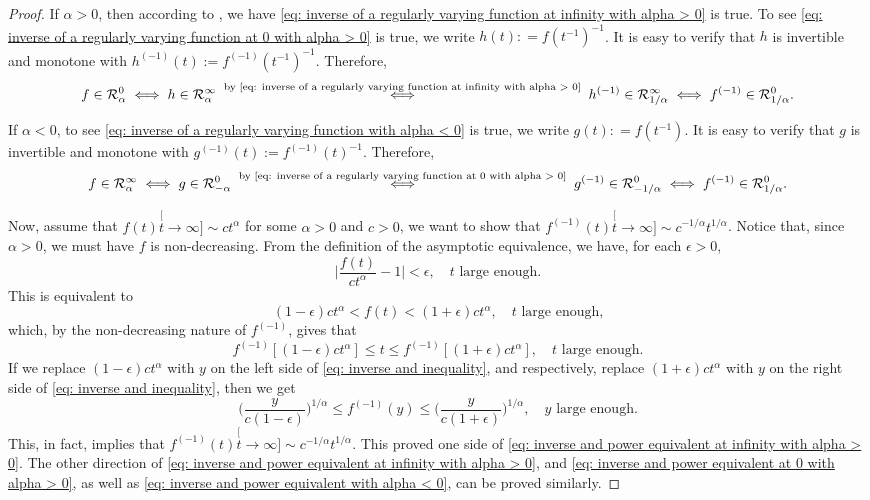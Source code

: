 \documentclass[12pt, a4paper]{amsart}
\theoremstyle{definition}
\numberwithin{equation}{section}
\begin{document}
\begin{proof}
If $\alpha>0$, then according to \cite[Theorem 1.5.12.]{BinghamGoldieTeugels1989Regular}, we have \eqref{eq: inverse of a regularly varying function at infinity with alpha > 0} is true.
	To see 	\eqref{eq: inverse of a regularly varying function at 0 with alpha > 0} is true, we write $h(t) : = f(t^{-1})^{-1}$.
	It is  easy to verify that
	$h$ is invertible and monotone
	with $h^{(-1)}(t) := f^{(-1)}(t^{-1})^{-1}$.
	Therefore,
\[
	f
	\in \mathcal R^0_{\alpha}
	\iff h
	\in \mathcal R^\infty_{\alpha}
	\stackrel{  \text{ by \eqref{eq: inverse of a regularly varying function at infinity with alpha > 0} }   }{\iff} h^{(-1)}
	\in \mathcal R^\infty_{1/\alpha}
	\iff f^{(-1)}
	\in \mathcal R^0_{1/\alpha}.
\]

	If $\alpha < 0$, to see	\eqref{eq: inverse of a regularly varying function with alpha < 0} is true, we write $g(t) : = f(t^{-1})$.
	It is easy to verify that
	$g$ is invertible and monotone with $g^{(-1)}(t) := f^{(-1)}(t)^{-1}$.
	Therefore,
\[
	f
	\in \mathcal R^\infty_{\alpha}
	\iff g
	\in \mathcal R^0_{-\alpha}
	\stackrel{  \text{ by \eqref{eq: inverse of a regularly varying function at 0 with alpha > 0} }   }{\iff} g^{(-1)}
	\in \mathcal R^0_{-1/\alpha}
	\iff f^{(-1)}
	\in \mathcal R^0_{1/\alpha}.
\]
	
	Now, assume that
	$f(t) \stackrel[t\to \infty]{}{\sim} c t^\alpha$ for some $\alpha > 0$ and $c > 0$, we want to show that $f^{(-1)}(t) \stackrel[t\to \infty]{}{\sim} c^{-1/\alpha} t^{1/\alpha}$.
	Notice that, since $\alpha >0$, we must have $f$ is non-decreasing.
	From the definition of the asymptotic equivalence, we have, for each $\epsilon> 0$,
\[
	\Big|\frac{f(t)}{c t^\alpha} - 1\Big|
	< \epsilon,
	\quad t \text{ large enough.}
\]
	This is equivalent to
\[
	(1-\epsilon) c t^{\alpha}
	< f(t)
	< (1+ \epsilon)c t^{\alpha},
	\quad t \text{ large enough,}
\]
	which, by the non-decreasing nature of $f^{(-1)}$, gives that
\[\label{eq: inverse and inequality}
	f^{(-1)}[(1-\epsilon) c t^{\alpha}] \leq t \leq f^{(-1)}[(1+ \epsilon)c t^{\alpha}], \quad t \text{ large enough.}
\]
	If we replace $(1-\epsilon) c t^{\alpha}$ with $y$ on the left side of \eqref{eq: inverse and inequality}, and respectively, replace $(1+\epsilon) c t^{\alpha}$ with $y$ on the right side of \eqref{eq: inverse and inequality}, then we get
\[
	\Big(\frac{y}{c(1-\epsilon)}\Big)^{1/\alpha}
	\leq f^{(-1)}(y) \leq \Big(\frac{y}{c(1+\epsilon)}\Big)^{1/\alpha},
	\quad y \text{ large enough.}
\]
	This, in fact, implies that $ f^{(-1)}(t) \stackrel[t\to \infty]{}{\sim} c^{-1/\alpha} t^{1/\alpha}. $
	This proved one side of \eqref{eq: inverse and power equivalent at infinity with alpha > 0}.
	The other direction of \eqref{eq: inverse and power equivalent at infinity with alpha > 0}, and \eqref{eq: inverse and power equivalent at 0 with alpha > 0}, as well as \eqref{eq: inverse and power equivalent with alpha < 0}, can be proved similarly.
\end{proof}
\end{document}
